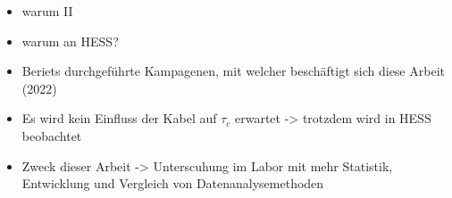 \begin{itemize}
    \item warum II 
    \item warum an HESS?
    \item Beriets durchgeführte Kampagenen, mit welcher beschäftigt sich diese Arbeit (2022)
    \item Es wird kein Einfluss der Kabel auf $\tau_c$ erwartet -> trotzdem wird in HESS beobachtet
    \item Zweck dieser Arbeit -> Unterscuhung im Labor mit mehr Statistik, Entwicklung und Vergleich von Datenanalysemethoden
\end{itemize}